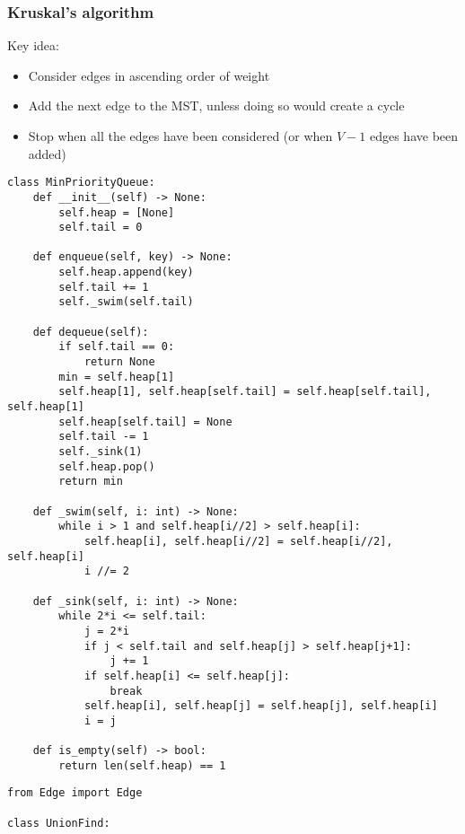 \documentclass[a4paper]{article}
\begin{document}
\subsubsection*{Kruskal's algorithm}
Key idea:
\begin{itemize}
    \item Consider edges in ascending order of weight
    \item Add the next edge to the MST, unless doing so would create a cycle
    \item Stop when all the edges have been considered (or when $V-1$ edges have been added)
\end{itemize}

\begin{lstlisting}
class MinPriorityQueue:
    def __init__(self) -> None:
        self.heap = [None]
        self.tail = 0

    def enqueue(self, key) -> None:
        self.heap.append(key)
        self.tail += 1
        self._swim(self.tail)

    def dequeue(self):
        if self.tail == 0:
            return None
        min = self.heap[1]
        self.heap[1], self.heap[self.tail] = self.heap[self.tail], self.heap[1]
        self.heap[self.tail] = None
        self.tail -= 1
        self._sink(1)
        self.heap.pop()
        return min

    def _swim(self, i: int) -> None:
        while i > 1 and self.heap[i//2] > self.heap[i]:
            self.heap[i], self.heap[i//2] = self.heap[i//2], self.heap[i]
            i //= 2

    def _sink(self, i: int) -> None:
        while 2*i <= self.tail:
            j = 2*i
            if j < self.tail and self.heap[j] > self.heap[j+1]:
                j += 1
            if self.heap[i] <= self.heap[j]:
                break
            self.heap[i], self.heap[j] = self.heap[j], self.heap[i]
            i = j

    def is_empty(self) -> bool:
        return len(self.heap) == 1
\end{lstlisting}

\begin{lstlisting}
from Edge import Edge

class UnionFind:
\end{lstlisting}
\end{document}
